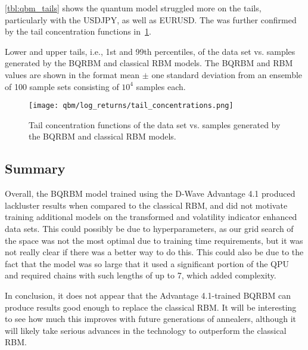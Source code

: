 \cref{tbl:qbm_tails} shows the quantum model struggled more on the tails, particularly with the USDJPY, as well as EURUSD.
The was further confirmed by the tail concentration functions in~\cref{fig:qbm_log_returns_tail_concentrations}.
\begin{table}[!htb]
    \centering
    \begin{adjustbox}{max width=\textwidth}
        
    \end{adjustbox}
    \caption{
        Lower and upper tails, i.e., 1st and 99th percentiles, of the data set vs. samples generated by the BQRBM and classical RBM models.
        The BQRBM and RBM values are shown in the format mean \(\pm\) one standard deviation from an ensemble of 100 sample sets consisting of \( 10^4 \) samples each.
    }
    \label{tbl:qbm_tails}
\end{table}

\begin{figure}[!htb]
    \begin{center}
        \texttt{[image: qbm/log\_returns/tail\_concentrations.png]}
    \end{center}
    \caption{Tail concentration functions of the data set vs. samples generated by the BQRBM and classical RBM models.}
    \label{fig:qbm_log_returns_tail_concentrations}
\end{figure}

\subsection{Summary}
Overall, the BQRBM model trained using the D-Wave Advantage 4.1 produced lackluster results when compared to the classical RBM, and did not motivate training additional models on the transformed and volatility indicator enhanced data sets.
This could possibly be due to hyperparameters, as our grid search of the space was not the most optimal due to training time requirements, but it was not really clear if there was a better way to do this.
This could also be due to the fact that the model was so large that it used a significant portion of the QPU and required chains with such lengths of up to 7, which added complexity.

In conclusion, it does not appear that the Advantage 4.1-trained BQRBM can produce results good enough to replace the classical RBM.
It will be interesting to see how much this improves with future generations of annealers, although it will likely take serious advances in the technology to outperform the classical RBM.

